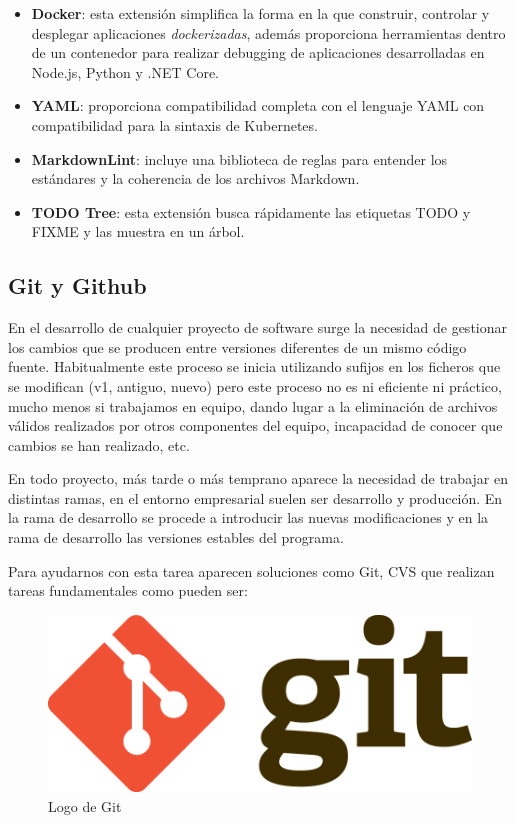 \begin{itemize}
    \item \textbf{Docker}: esta extensión simplifica la forma en la que construir, controlar y desplegar aplicaciones \textit{dockerizadas}, además proporciona herramientas dentro de un contenedor para realizar debugging de aplicaciones desarrolladas en Node.js, Python y .NET Core.
    \item \textbf{YAML}: proporciona compatibilidad completa con el lenguaje YAML con compatibilidad para la sintaxis de Kubernetes.
    \item \textbf{MarkdownLint}: incluye una biblioteca de reglas para entender los estándares y la coherencia de los archivos Markdown. 
    \item \textbf{TODO Tree}: esta extensión busca rápidamente las etiquetas TODO y FIXME y las muestra en un árbol. 
\end{itemize}


\subsection{Git y Github}


En el desarrollo de cualquier proyecto de software surge la necesidad de gestionar los cambios que se producen entre versiones diferentes de un mismo código fuente. Habitualmente este proceso se inicia utilizando sufijos en los ficheros que se modifican (v1, antiguo, nuevo) pero este proceso no es ni eficiente ni práctico, mucho menos si trabajamos en equipo, dando lugar a la eliminación de archivos válidos realizados por otros componentes del equipo, incapacidad de conocer que cambios se han realizado, etc.

En todo proyecto, más tarde o más temprano aparece la necesidad de trabajar en distintas ramas, en el entorno empresarial suelen ser desarrollo y producción. En la rama de desarrollo se procede a introducir las nuevas modificaciones y en la rama de desarrollo las versiones estables del programa.

Para ayudarnos con esta tarea aparecen soluciones como Git, CVS que realizan tareas fundamentales como pueden ser:

\begin{figure}[h]
    \centering
    \includegraphics[scale=0.1]{include/figuras/Git.png}
    \caption{Logo de Git}
    \label{fig:git}
\end{figure}

